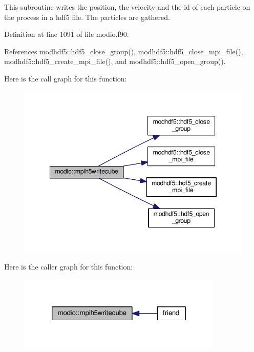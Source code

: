 This subroutine writes the position, the velocity and the id of each particle on the process in a hdf5 file. The particles are gathered. 



Definition at line 1091 of file modio.\-f90.



References modhdf5\-::hdf5\-\_\-close\-\_\-group(), modhdf5\-::hdf5\-\_\-close\-\_\-mpi\-\_\-file(), modhdf5\-::hdf5\-\_\-create\-\_\-mpi\-\_\-file(), and modhdf5\-::hdf5\-\_\-open\-\_\-group().



Here is the call graph for this function\-:\nopagebreak
\begin{figure}[H]
\begin{center}
\leavevmode
\includegraphics[width=346pt]{classmodio_af1c4604ad1d5c38063a516fe6ef6756d_cgraph}
\end{center}
\end{figure}




Here is the caller graph for this function\-:\nopagebreak
\begin{figure}[H]
\begin{center}
\leavevmode
\includegraphics[width=276pt]{classmodio_af1c4604ad1d5c38063a516fe6ef6756d_icgraph}
\end{center}
\end{figure}


